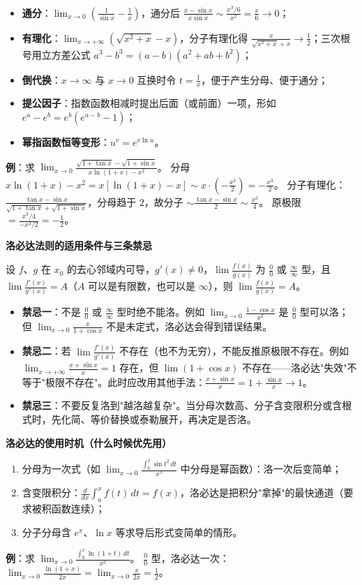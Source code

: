 \documentclass[11pt,openany,UTF8]{ctexbook}
\begin{document}
\begin{itemize}
\item \textbf{通分}：$\lim_{x\to 0}\left(\frac{1}{\sin x}-\frac1x\right)$，通分后 $\frac{x-\sin x}{x\sin x}\sim\frac{x^3/6}{x^2}=\frac{x}{6}\to 0$；
\item \textbf{有理化}：$\lim_{x\to+\infty}\left(\sqrt{x^{2}+x}-x\right)$，分子有理化得 $\frac{x}{\sqrt{x^2+x}+x}\to\frac12$；三次根号用立方差公式 $a^3-b^3=(a-b)(a^2+ab+b^2)$；
\item \textbf{倒代换}：$x\to\infty$ 与 $x\to 0$ 互换时令 $t=\frac1x$，便于产生分母、便于通分；
\item \textbf{提公因子}：指数函数相减时提出后面（或前面）一项，形如 $e^{a}-e^{b}=e^{b}(e^{a-b}-1)$；
\item \textbf{幂指函数恒等变形}：$u^{v}=e^{v\ln u}$。
\end{itemize}
\textbf{例}：求 $\lim_{x\to 0}\frac{\sqrt{1+\tan x}-\sqrt{1+\sin x}}{x\ln(1+x)-x^{2}}$。 分母 $x\ln(1+x)-x^2=x[\ln(1+x)-x]\sim x\cdot\left(-\frac{x^{2}}{2}\right)=-\frac{x^{3}}{2}$。 分子有理化：$\frac{\tan x-\sin x}{\sqrt{1+\tan x}+\sqrt{1+\sin x}}$，分母趋于 $2$，故分子 $\sim\frac{\tan x-\sin x}{2}\sim\frac{x^{3}}{4}$。 原极限 $=\frac{x^{3}/4}{-x^{3}/2}=-\frac12$。

\textbf{洛必达法则的适用条件与三条禁忌}

设 $f$、$g$ 在 $x_0$ 的去心邻域内可导，$g'(x)\ne 0$，$\lim\frac{f(x)}{g(x)}$ 为 $\frac00$ 或 $\frac{\infty}{\infty}$ 型，且 $\lim\frac{f'(x)}{g'(x)}=A$（$A$ 可以是有限数，也可以是 $\infty$），则 $\lim\frac{f(x)}{g(x)}=A$。

\begin{itemize}
\item \textbf{禁忌一}：不是 $\frac00$ 或 $\frac{\infty}{\infty}$ 型时绝不能洛。例如 $\lim_{x\to 0}\frac{1-\cos x}{x^{2}}$ 是 $\frac00$ 型可以洛；但 $\lim_{x\to 0}\frac{x}{1+\cos x}$ 不是未定式，洛必达会得到错误结果。
\item \textbf{禁忌二}：若 $\lim\frac{f'(x)}{g'(x)}$ 不存在（也不为无穷），不能反推原极限不存在。例如 $\lim_{x\to+\infty}\frac{x+\sin x}{x}=1$ 存在，但 $\lim(1+\cos x)$ 不存在——洛必达"失效"不等于"极限不存在"。此时应改用其他手法：$\frac{x+\sin x}{x}=1+\frac{\sin x}{x}\to 1$。
\item \textbf{禁忌三}：不要反复洛到"越洛越复杂"。当分母次数高、分子含变限积分或含根式时，先化简、等价替换或泰勒展开，再决定是否洛。
\end{itemize}
\textbf{洛必达的使用时机（什么时候优先用）}

\begin{enumerate}
\item 分母为一次式（如 $\lim_{x\to 0}\frac{\int_0^x\sin t^{2}\,dt}{x^{3}}$ 中分母是幂函数）：洛一次后变简单；
\item 含变限积分：$\frac{d}{dx}\int_a^{x}f(t)\,dt=f(x)$，洛必达是把积分"拿掉"的最快通道（要求被积函数连续）；
\item 分子分母含 $e^{x}$、$\ln x$ 等求导后形式变简单的情形。
\end{enumerate}
\textbf{例}：求 $\lim_{x\to 0}\frac{\int_0^{x}\ln(1+t)\,dt}{x^{2}}$。 $\frac00$ 型，洛必达一次：$\lim_{x\to 0}\frac{\ln(1+x)}{2x}=\lim_{x\to 0}\frac{x}{2x}=\frac12$。
\end{document}
